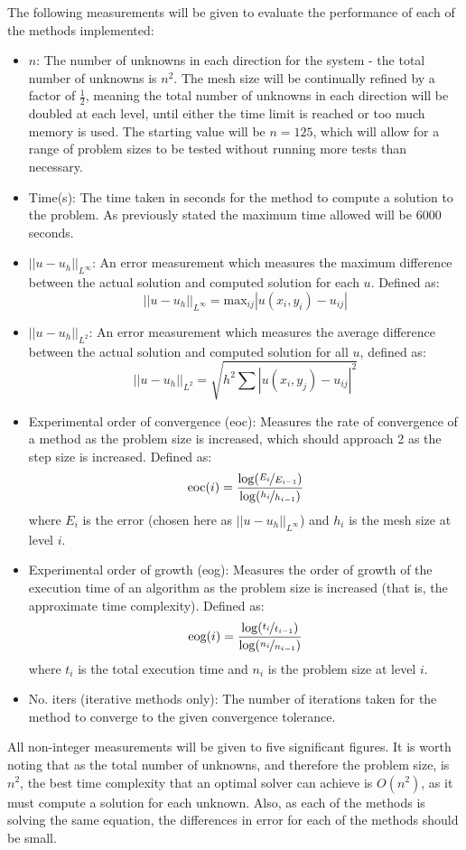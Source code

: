 \documentclass[11pt]{article}
\numberwithin{equation}{section}
\begin{document}
The following measurements will be given to evaluate the performance of each of the methods implemented:
\begin{itemize}
\item $n$: The number of unknowns in each direction for the system - the total number of unknowns is $n^2$. The mesh size will be continually refined by a factor of $\frac{1}{2}$, meaning the total number of unknowns in each direction will be doubled at each level, until either the time limit is reached or too much memory is used. The starting value will be $n=125$, which will allow for a range of problem sizes to be tested without running more tests than necessary.
\item Time(s): The time taken in seconds for the method to compute a solution to the problem. As previously stated the maximum time allowed will be 6000 seconds.
\item $|| u - u_h ||_{L^\infty} $: An error measurement which measures the maximum difference between the actual solution and computed solution for each $u$. Defined as:
 \[ || u - u_h ||_{L^\infty} = \text{max}_{ij} | u(x_i, y_i) - u_{ij} | \]
\item $|| u - u_h ||_{L^2} $: An error measurement which measures the average difference between the actual solution and computed solution for all $u$, defined as:
\[ || u - u_h ||_{L^2} = \sqrt{h^2 \sum | u(x_i,y_j) - u_{ij} |^2} \]
\item Experimental order of convergence (eoc): Measures the rate of convergence of a method as the problem size is increased, which should approach 2 as the step size is increased. Defined as:
\[ \text{eoc}(i) = \frac{\log(\nicefrac{E_i}{E_{i-1}})}{\log(\nicefrac{h_i}{h_{i-1}})} \]
where $E_i$ is the error (chosen here as $|| u - u_h ||_{L^\infty}$) and $h_i$ is the mesh size at level $i$. 
\item Experimental order of growth (eog): Measures the order of growth of the execution time of an algorithm as the problem size is increased (that is, the approximate time complexity). Defined as:
\[ \text{eog}(i) = \frac{\log(\nicefrac{t_{i}}{t_{i-1}})}{\log(\nicefrac{n_{i}}{n_{i-1}})} \]
where $t_i$ is the total execution time and $n_i$ is the problem size at level $i$.
\item No. iters (iterative methods only): The number of iterations taken for the method to converge to the given convergence tolerance.
\end{itemize}
All non-integer measurements will be given to five significant figures. It is worth noting that as the total number of unknowns, and therefore the problem size, is $n^2$, the best time complexity that an optimal solver can achieve is $O(n^2)$, as it must compute a solution for each unknown. Also, as each of the methods is solving the same equation, the differences in error for each of the methods should be small.
\end{document}
